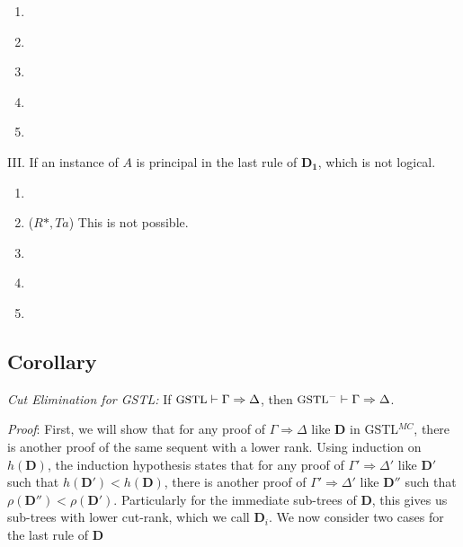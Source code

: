 \begin{enumerate}
	\begin{enumerate}[label={\Alph*.}]
		\item \label{c:ra-la1} 

		\item \label{c:ra-la2} 

		\item \label{c:ro1-lo} 

		\item \label{c:ro2-lo} 


		\item \label{c:ri-li} 

	\end{enumerate}

	III. If an instance of $A$ is principal in the last rule of $\mathbf{D_1}$, which is not logical.
	\begin{enumerate}[label={\roman*.}]
		\item \label{c:*-id} 

		\item ($R*, Ta$) This is not possible.

		\item \label{c:*-ex} 

		\item \label{c:*-lw-p} 
	
		\item \label{c:*-lc-p} 
	\end{enumerate}
\end{enumerate}

\subsection{Corollary} \label{cut-elim} \emph{Cut Elimination for GSTL: }
If $\small\text{GSTL}\vdash \Gamma \Rightarrow \Delta$, then $\small\text{GSTL}^-\vdash \Gamma \Rightarrow \Delta$.

\textit{Proof}: First, we will show that for any proof of $\Gamma \Rightarrow \Delta$ like $\mathbf{D}$ in GSTL$^{MC}$, there is another proof of the same sequent with a lower rank. Using induction on $h(\mathbf{D})$, the induction hypothesis states that for any proof of $\Gamma' \Rightarrow \Delta'$ like $\mathbf{D}'$ such that $h(\mathbf{D}') < h(\mathbf{D})$, there is another proof of $\Gamma' \Rightarrow \Delta'$ like $\mathbf{D}''$ such that $\rho(\mathbf{D}'') < \rho(\mathbf{D}')$. Particularly for the immediate sub-trees of $\mathbf{D}$, this gives us sub-trees with lower cut-rank, which we call $\mathbf{D}_i$. We now consider two cases for the last rule of $\mathbf{D}$

